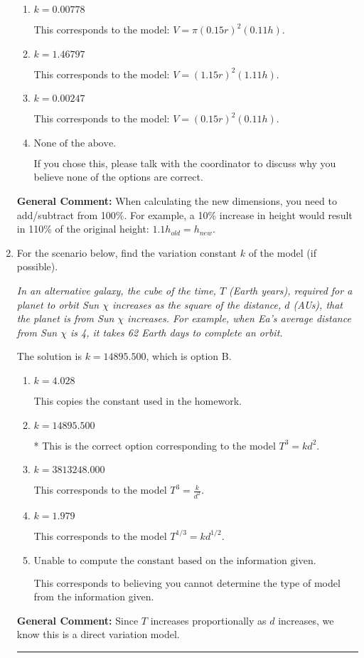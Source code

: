 \documentclass{extbook}[14pt]
\newcommand{\litem}[1]{\item #1

\rule{\textwidth}{0.4pt}}
\begin{document}
\begin{enumerate}
{\begin{enumerate}[label=\Alph*.]
* This is the correct option and corresponds to the model: $V = \pi (1.15 r)^2 (1.11 h)$.
\item \( k = 0.00778 \)

This corresponds to the model: $V = \pi (0.15 r)^2 (0.11 h)$.
\item \( k = 1.46797 \)

This corresponds to the model: $V = (1.15 r)^2 (1.11 h)$.
\item \( k = 0.00247 \)

This corresponds to the model: $V = (0.15 r)^2 (0.11 h)$.
\item \( \text{None of the above.} \)

If you chose this, please talk with the coordinator to discuss why you believe none of the options are correct.
\end{enumerate}

\textbf{General Comment:} When calculating the new dimensions, you need to add/subtract from 100\%. For example, a 10\% increase in height would result in 110\% of the original height: $1.1h_{old} = h_{new}$.
}
\litem{
For the scenario below, find the variation constant $k$ of the model (if possible).

\begin{center}
    \textit{ In an alternative galaxy, the cube of the time, $T$ (Earth years), required for a planet to orbit Sun $\chi$ increases as the square of the distance, $d$ (AUs), that the planet is from Sun $\chi$ increases. For example, when Ea's average distance from Sun $\chi$ is 4, it takes 62 Earth days to complete an orbit. }
\end{center}
The solution is \( k = 14895.500 \), which is option B.\begin{enumerate}[label=\Alph*.]
\item \( k = 4.028 \)

This copies the constant used in the homework.
\item \( k = 14895.500 \)

* This is the correct option corresponding to the model $T^{3} = k d^{2}$.
\item \( k = 3813248.000 \)

This corresponds to the model $T^{3} = \frac{k}{d^{2}}$.
\item \( k = 1.979 \)

This corresponds to the model $T^{1/3} = k d^{1/2}$.
\item \( \text{Unable to compute the constant based on the information given.} \)

This corresponds to believing you cannot determine the type of model from the information given.
\end{enumerate}

\textbf{General Comment:} Since $T$ increases proportionally as $d$ increases, we know this is a direct variation model.
}
\end{enumerate}
\end{document}
